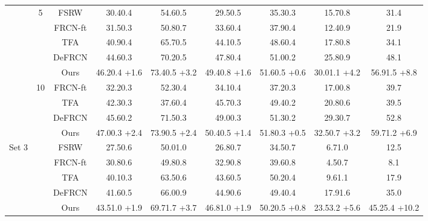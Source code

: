 \documentclass{article}
\begin{document}
\begin{table}[hbt!]
\begin{adjustbox}{width=0.79\textwidth}
{\begin{tabular}{c|c|c|ccc|c|cc}
         \cmidrule{2-9}
         &\multirow{5}{*}{5}&FSRW \cite{metayolo} & 30.40.4&54.60.5&29.50.5&35.30.3&15.70.8&31.4  \\
         &&FRCN-ft \cite{metarcnn}&31.50.3&50.80.7&33.60.4&37.90.4&12.40.9&21.9\\
         &&TFA \cite{tfa}&40.90.4&65.70.5&44.10.5&48.60.4&17.80.8&34.1\\
         &&DeFRCN \cite{defrcn}&44.60.3&70.20.5&47.80.4&51.00.2&25.80.9&48.1\\
         && \cellcolor{gray!30}Ours&\cellcolor{gray!30}46.20.4 {\scriptsize \color{red}+1.6}&\cellcolor{gray!30}73.40.5 {\scriptsize \color{red}+3.2}&\cellcolor{gray!30}49.40.8 {\scriptsize \color{red}+1.6}&\cellcolor{gray!30}51.60.5 {\scriptsize \color{red}+0.6}&\cellcolor{gray!30}30.01.1 {\scriptsize \color{red}+4.2}&\cellcolor{gray!30}56.91.5 {\scriptsize \color{red}+8.8}\\
         \cmidrule{2-9}
         &\multirow{5}{*}{10}&FRCN-ft \cite{metarcnn}&32.20.3&52.30.4&34.10.4&37.20.3&17.00.8&39.7\\
         &&TFA \cite{tfa}&42.30.3&37.60.4&45.70.3&49.40.2&20.80.6&39.5\\
         &&DeFRCN \cite{defrcn}&45.60.2&71.50.3&49.00.3&51.30.2&29.30.7&52.8\\
         && \cellcolor{gray!30}Ours&\cellcolor{gray!30}47.00.3 {\scriptsize \color{red}+2.4}&\cellcolor{gray!30}73.90.5 {\scriptsize \color{red}+2.4}&\cellcolor{gray!30}50.40.5 {\scriptsize \color{red}+1.4}&\cellcolor{gray!30}51.80.3 {\scriptsize \color{red}+0.5}&\cellcolor{gray!30}32.50.7 {\scriptsize \color{red}+3.2}&\cellcolor{gray!30}59.71.2 {\scriptsize \color{red}+6.9}\\
         \midrule
         \multirow{25}{*}{ Set 3}&\multirow{5}{*}{1}&FSRW \cite{metayolo} &27.50.6&50.01.0&26.80.7& 34.50.7&6.71.0&12.5 \\
         &&FRCN-ft \cite{metarcnn}&30.80.6&49.80.8&32.90.8&39.60.8&4.50.7&8.1\\
         &&TFA \cite{tfa}&40.10.3&63.50.6&43.60.5&50.20.4&9.61.1&17.9\\
         && DeFRCN \cite{defrcn}&41.60.5&66.00.9&44.90.6&49.40.4&17.91.6&35.0\\
         && \cellcolor{gray!30}Ours&\cellcolor{gray!30}43.51.0 {\scriptsize \color{red}+1.9}&\cellcolor{gray!30}69.71.7 {\scriptsize \color{red}+3.7}&\cellcolor{gray!30}46.81.0 {\scriptsize \color{red}+1.9}&\cellcolor{gray!30}50.20.5 {\scriptsize \color{red}+0.8}&\cellcolor{gray!30}23.53.2 {\scriptsize \color{red}+5.6}&\cellcolor{gray!30}45.25.4 {\scriptsize \color{red}+10.2}\\

\end{tabular}}
\end{adjustbox}
\end{table}
\end{document}
